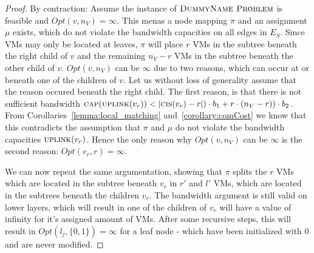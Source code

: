 \documentclass[9pt,twocolumn]{scrartcl}
\newcommand{\Capacity}{\ensuremath{\textsc{cap}}}
\newcommand{\Problem}{\textsc{DummyName Problem}}
\newcommand{\VmChunkAssignment}{\mu}
\newcommand{\NodeMapping}{\pi}
\newcommand{\SubstrateEdges}{\ensuremath{E_S}}
\newcommand{\SubstrateNode}{\ensuremath{v}}
\newcommand{\Leaf}{\ensuremath{l}}
\newcommand{\Opt}{\ensuremath{Opt}}
\newcommand{\Uplink}{\ensuremath{\textsc{uplink}}}
\newcommand{\ChunkCount}{\ensuremath{\textsc{cis}}}
\newcommand{\CostTrans}{\ensuremath{b_1}}
\newcommand{\CostCom}{\ensuremath{b_2}}
\newcommand{\Vms}{\ensuremath{n_V}}
\begin{document}
\begin{appendix}
\begin{proof}
By contraction: Assume the instance of $\Problem$ is feasible and
$\Opt(\SubstrateNode,\Vms) = \infty$. This menas a node mapping $\NodeMapping$
and an assignment $\VmChunkAssignment$ exists, which do not violate the
bandwidth capacities on all edges in $\SubstrateEdges$. Since VMs may only be
located at leaves, $\NodeMapping$ will place $r$ VMs in the subtree beneath the
right child of $\SubstrateNode$ and the remaining $\Vms - r$ VMs in the subtree
beneath the other child of $\SubstrateNode$.
$\Opt(\SubstrateNode,\Vms)$ can be $\infty$ due to two reasons, which can occur
at or beneath one of the children of $\SubstrateNode$. Let us without loss of
generality assume that the reason occured beneath the right child. The first
reason, is that there is not sufficient bandwidth
$\Capacity(\Uplink(\SubstrateNode_r)) < |\ChunkCount(\SubstrateNode_{r}) - r|)
\cdot \CostTrans + r \cdot (\Vms - r)) \cdot \CostCom$. From
Corollaries~\ref{lemma:local_matching} and~\ref{corollary:comCost} we know
that this contradicts the assumption that $\NodeMapping$
and $\VmChunkAssignment$ do not violate the bandwidth capacities
$\Uplink(\SubstrateNode_r)$. Hence the only reason why
$\Opt(\SubstrateNode,\Vms)$ can be $\infty$ is the second reason:
$\Opt(\SubstrateNode_r, r) = \infty$.

We can now repeat the same argumentation, showing that $\NodeMapping$ splits
the $r$ VMs which are located in the subtree beneath $\SubstrateNode_r$ in $r'$
and $l'$ VMs, which are located in the subtrees beneath the
children $\SubstrateNode_r$. The bandwidth argument is still valid on lower
layers, which will result in one of the children of $\SubstrateNode_r$ will
have a value of infinity for it's assigned amount of VMs. After some
recursive steps, this will result in $\Opt(\Leaf_j, \{0,1\}) = \infty$
for a leaf node - which have been initialized with $0$ and
are never modified.
\end{proof}



\end{appendix}
\end{document}
